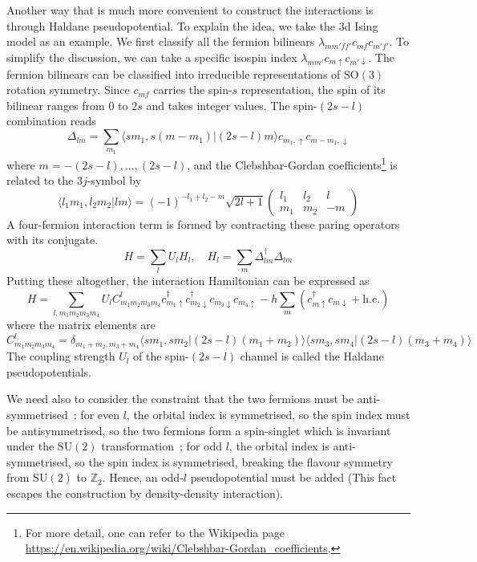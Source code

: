 \documentclass{timesjhep}
\begin{document}
Another way that is much more convenient to construct the interactions is through Haldane pseudopotential. To explain the idea, we take the 3d Ising model as an example. We first classify all the fermion bilinears $\lambda_{mm'ff'}c_{mf}c_{m'f'}$. To simplify the discussion, we can take a specific isospin index $\lambda_{mm'}c_{m\uparrow}c_{m'\downarrow}$. The fermion bilinears can be classified into irreducible representations of $\mathrm{SO}(3)$ rotation symmetry. Since $c_{mf}$ carries the spin-$s$ representation, the spin of its bilinear ranges from $0$ to $2s$ and takes integer values. The spin-$(2s-l)$ combination reads 
\begin{equation}
    \Delta_{lm}=\sum_{m_1}\langle sm_1,s(m-m_1)|(2s-l)m\rangle c_{m_1,\uparrow}c_{m-m_1,\downarrow}
\end{equation} 
where $m=-(2s-l),\dots,(2s-l)$, and the Clebshbar-Gordan coefficients\footnote{For more detail, one can refer to the Wikipedia page \url{https://en.wikipedia.org/wiki/Clebshbar-Gordan_coefficients}.} is related to the $3j$-symbol by
\begin{equation}
    \langle l_1m_1,l_2m_2|lm\rangle=(-1)^{-l_1+l_2-m}\sqrt{2l+1}\begin{pmatrix}l_1&l_2&l\\m_1&m_2&-m\end{pmatrix}
\end{equation}
A four-fermion interaction term is formed by contracting these paring operators with its conjugate. 
\begin{equation}
    H=\sum_lU_lH_l,\quad H_l=\sum_m\Delta_{lm}^\dagger\Delta_{lm} 
\end{equation} 
Putting these altogether, the interaction Hamiltonian can be expressed as 
\begin{equation}
    H=\sum_{l,m_1m_2m_3m_4}U_lC^l_{m_1m_2m_3m_4}c^\dagger_{m_1\uparrow}c^\dagger_{m_2\downarrow}c_{m_3\downarrow}c_{m_4\uparrow}-h\sum_m(c_{m\uparrow}^\dagger c_{m\downarrow}+\mathrm{h.c.}) 
\end{equation}
where the matrix elements are 
\begin{equation}
    C^l_{m_1m_2m_3m_4}=\delta_{m_1+m_2,m_3+m_4}\langle sm_1,sm_2|(2s-l)(m_1+m_2)\rangle\langle sm_3,sm_4|(2s-l)(m_3+m_4)\rangle 
    \label{eq:ps_pot_coeff}
\end{equation} 
The coupling strength $U_l$ of the spin-$(2s-l)$ channel is called the Haldane pseudopotentials. 

We need also to consider the constraint that the two fermions must be anti-symmetrised~: for even $l$, the orbital index is symmetrised, so the spin index must be antisymmetrised, so the two fermions form a spin-singlet which is invariant under the $\mathrm{SU}(2)$ transformation~; for odd $l$, the orbital index is anti-symmetrised, so the spin index is symmetrised, breaking the flavour symmetry from $\mathrm{SU}(2)$ to $\mathbb{Z}_2$. Hence, an odd-$l$ pseudopotential must be added (This fact escapes the construction by density-density interaction). 
\end{document}
